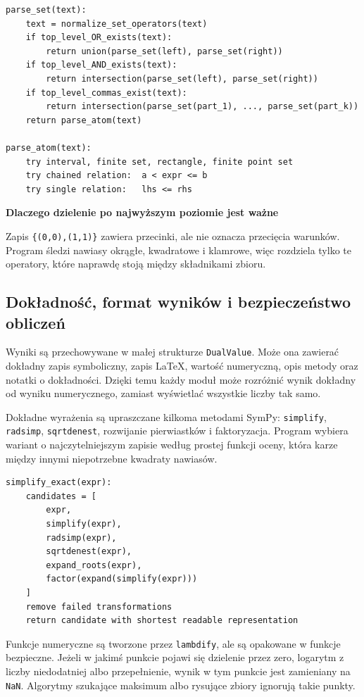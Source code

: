\documentclass[12pt,a4paper]{article}
\newcommand{\plainnote}[2]{%
\par\medskip
\noindent\begin{minipage}{0.94\linewidth}
\textbf{#1}\par\smallskip
#2
\end{minipage}
\par\medskip
}
\newcommand{\techbox}[2]{\plainnote{#1}{#2}}
\begin{document}
\begin{lstlisting}[style=pseudo,caption={Rekurencyjne parsowanie zbioru}]
parse_set(text):
    text = normalize_set_operators(text)
    if top_level_OR_exists(text):
        return union(parse_set(left), parse_set(right))
    if top_level_AND_exists(text):
        return intersection(parse_set(left), parse_set(right))
    if top_level_commas_exist(text):
        return intersection(parse_set(part_1), ..., parse_set(part_k))
    return parse_atom(text)

parse_atom(text):
    try interval, finite set, rectangle, finite point set
    try chained relation:  a < expr <= b
    try single relation:   lhs <= rhs
\end{lstlisting}

\techbox{Dlaczego dzielenie po najwyższym poziomie jest ważne}{
Zapis \texttt{\{(0,0),(1,1)\}} zawiera przecinki, ale nie oznacza przecięcia warunków. Program śledzi nawiasy okrągłe, kwadratowe i klamrowe, więc rozdziela tylko te operatory, które naprawdę stoją między składnikami zbioru.
}

\subsection{Dokładność, format wyników i bezpieczeństwo obliczeń}

Wyniki są przechowywane w małej strukturze \texttt{DualValue}. Może ona zawierać dokładny zapis symboliczny, zapis LaTeX, wartość numeryczną, opis metody oraz notatki o dokładności. Dzięki temu każdy moduł może rozróżnić wynik dokładny od wyniku numerycznego, zamiast wyświetlać wszystkie liczby tak samo.

Dokładne wyrażenia są upraszczane kilkoma metodami SymPy: \texttt{simplify}, \texttt{radsimp}, \texttt{sqrtdenest}, rozwijanie pierwiastków i faktoryzacja. Program wybiera wariant o najczytelniejszym zapisie według prostej funkcji oceny, która karze między innymi niepotrzebne kwadraty nawiasów.

\begin{lstlisting}[style=pseudo,caption={Dobór czytelniejszej postaci dokładnej}]
simplify_exact(expr):
    candidates = [
        expr,
        simplify(expr),
        radsimp(expr),
        sqrtdenest(expr),
        expand_roots(expr),
        factor(expand(simplify(expr)))
    ]
    remove failed transformations
    return candidate with shortest readable representation
\end{lstlisting}

Funkcje numeryczne są tworzone przez \texttt{lambdify}, ale są opakowane w funkcje bezpieczne. Jeżeli w jakimś punkcie pojawi się dzielenie przez zero, logarytm z liczby niedodatniej albo przepełnienie, wynik w tym punkcie jest zamieniany na \texttt{NaN}. Algorytmy szukające maksimum albo rysujące zbiory ignorują takie punkty.
\end{document}
